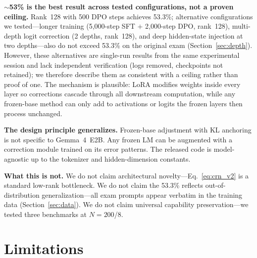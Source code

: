\documentclass[11pt]{article}
\begin{document}
\textbf{$\sim$53\% is the best result across tested configurations, not a proven ceiling.}
Rank~128 with 500 DPO steps achieves 53.3\%; alternative configurations we tested---longer training (5{,}000-step SFT $+$ 2{,}000-step DPO, rank~128), multi-depth logit correction (2 depths, rank~128), and deep hidden-state injection at two depths---also do not exceed 53.3\% on the original exam (Section~\ref{sec:depth}).
However, these alternatives are single-run results from the same experimental session and lack independent verification (logs removed, checkpoints not retained); we therefore describe them as consistent with a ceiling rather than proof of one.
The mechanism is plausible: LoRA modifies weights inside every layer so corrections cascade through all downstream computation, while any frozen-base method can only add to activations or logits the frozen layers then process unchanged.

\textbf{The design principle generalizes.}
Frozen-base adjustment with KL anchoring is not specific to Gemma~4~E2B.
Any frozen LM can be augmented with a correction module trained on its error patterns.
The released code is model-agnostic up to the tokenizer and hidden-dimension constants.

\textbf{What this is not.}
We do not claim architectural novelty---Eq.~\ref{eq:crn_v2} is a standard low-rank bottleneck.
We do not claim the 53.3\% reflects out-of-distribution generalization---all exam prompts appear verbatim in the training data (Section~\ref{sec:data}).
We do not claim universal capability preservation---we tested three benchmarks at $N{=}200$/$8$.

\section{Limitations}
\end{document}
